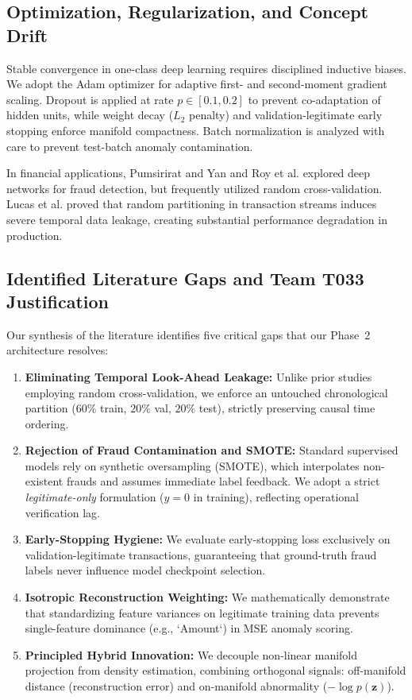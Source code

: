 \subsection{Optimization, Regularization, and Concept Drift}
Stable convergence in one-class deep learning requires disciplined inductive biases. We adopt the Adam optimizer \cite{kingma2015adam} for adaptive first- and second-moment gradient scaling. Dropout \cite{srivastava2014dropout} is applied at rate $p \in [0.1, 0.2]$ to prevent co-adaptation of hidden units, while weight decay ($L_2$ penalty) and validation-legitimate early stopping \cite{goodfellow2016deep} enforce manifold compactness. Batch normalization \cite{ioffe2015batch} is analyzed with care to prevent test-batch anomaly contamination.

In financial applications, Pumsirirat and Yan \cite{pumsirirat2018credit} and Roy et al. \cite{roy2018deep} explored deep networks for fraud detection, but frequently utilized random cross-validation. Lucas et al. \cite{lucas2020dataset} proved that random partitioning in transaction streams induces severe temporal data leakage, creating substantial performance degradation in production.

\subsection{Identified Literature Gaps and Team T033 Justification}
Our synthesis of the literature identifies five critical gaps that our Phase~2 architecture resolves:
\begin{enumerate}
    \item \textbf{Eliminating Temporal Look-Ahead Leakage:} Unlike prior studies employing random cross-validation, we enforce an untouched chronological partition ($60\%$ train, $20\%$ val, $20\%$ test), strictly preserving causal time ordering.
    \item \textbf{Rejection of Fraud Contamination and SMOTE:} Standard supervised models rely on synthetic oversampling (SMOTE), which interpolates non-existent frauds and assumes immediate label feedback. We adopt a strict \emph{legitimate-only} formulation ($y=0$ in training), reflecting operational verification lag.
    \item \textbf{Early-Stopping Hygiene:} We evaluate early-stopping loss exclusively on validation-legitimate transactions, guaranteeing that ground-truth fraud labels never influence model checkpoint selection.
    \item \textbf{Isotropic Reconstruction Weighting:} We mathematically demonstrate that standardizing feature variances on legitimate training data prevents single-feature dominance (e.g., `Amount`) in MSE anomaly scoring.
    \item \textbf{Principled Hybrid Innovation:} We decouple non-linear manifold projection from density estimation, combining orthogonal signals: off-manifold distance (reconstruction error) and on-manifold abnormality ($-\log p(\mathbf{z})$).
\end{enumerate}
